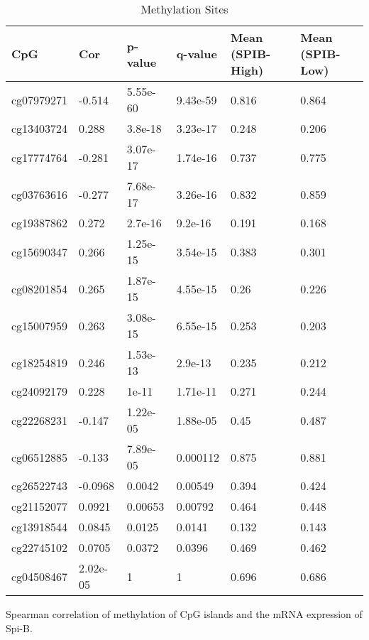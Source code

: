 \begin{table}
    \caption{Methylation Sites}
    \begin{tabular}{l|lllll}
        CpG & Cor & p-value & q-value & Mean (SPIB-High) & Mean (SPIB-Low) \\ \hline
        cg07979271 & -0.514 & 5.55e-60 & 9.43e-59 & 0.816 & 0.864\\ 
        cg13403724 & 0.288 & 3.8e-18 & 3.23e-17 & 0.248 & 0.206\\ 
        cg17774764 & -0.281 & 3.07e-17 & 1.74e-16 & 0.737 & 0.775\\ 
        cg03763616 & -0.277 & 7.68e-17 & 3.26e-16 & 0.832 & 0.859\\ 
        cg19387862 & 0.272 & 2.7e-16 & 9.2e-16 & 0.191 & 0.168\\ 
        cg15690347 & 0.266 & 1.25e-15 & 3.54e-15 & 0.383 & 0.301\\ 
        cg08201854 & 0.265 & 1.87e-15 & 4.55e-15 & 0.26 & 0.226\\ 
        cg15007959 & 0.263 & 3.08e-15 & 6.55e-15 & 0.253 & 0.203\\ 
        cg18254819 & 0.246 & 1.53e-13 & 2.9e-13 & 0.235 & 0.212\\ 
        cg24092179 & 0.228 & 1e-11 & 1.71e-11 & 0.271 & 0.244\\ 
        cg22268231 & -0.147 & 1.22e-05 & 1.88e-05 & 0.45 & 0.487\\ 
        cg06512885 & -0.133 & 7.89e-05 & 0.000112 & 0.875 & 0.881\\ 
        cg26522743 & -0.0968 & 0.0042 & 0.00549 & 0.394 & 0.424\\ 
        cg21152077 & 0.0921 & 0.00653 & 0.00792 & 0.464 & 0.448\\ 
        cg13918544 & 0.0845 & 0.0125 & 0.0141 & 0.132 & 0.143\\ 
        cg22745102 & 0.0705 & 0.0372 & 0.0396 & 0.469 & 0.462\\ 
        cg04508467 & 2.02e-05 & 1 & 1 & 0.696 & 0.686\\ \hline
    \end{tabular}\newline
    Spearman correlation of methylation of CpG islands and the mRNA expression of Spi-B.
    \label{meth_table}
\end{table} 
    